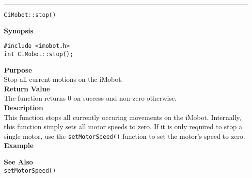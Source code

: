 \noindent
\vspace{5pt}
\rule{6.5in}{0.015in}
\noindent
{\LARGE \texttt{CiMobot::stop()}}\\
{}

\noindent
{\bf Synopsis}\\
\begin{verbatim}
#include <imobot.h>
int CiMobot::stop();
\end{verbatim}

\noindent
{\bf Purpose}\\
Stop all current motions on the iMobot.\\

\noindent
{\bf Return Value}\\
The function returns 0 on success and non-zero otherwise.\\

\noindent
{\bf Description}\\
This function stops all currently occuring movements on the iMobot. Internally, this function simply sets all motor speeds to zero. If it is only required to stop a single motor, use the 
\texttt{setMotorSpeed()} function to set the motor's speed to zero. \\

\noindent
{\bf Example}\\
\noindent

\noindent
{\bf See Also}\\
\texttt{setMotorSpeed()}

